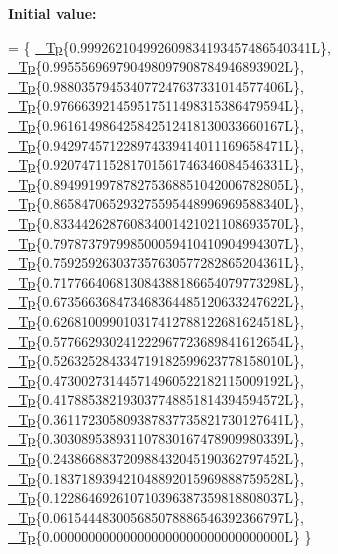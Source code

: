 {\bfseries Initial value\+:}
\begin{DoxyCode}
=
      \{
        \hyperlink{namespace____gnu__cxx_a3b19a9c800ca194374ef9172290f7d79}{\_Tp}\{0.999262104992609834193457486540341L\},
        \hyperlink{namespace____gnu__cxx_a3b19a9c800ca194374ef9172290f7d79}{\_Tp}\{0.995556969790498097908784946893902L\},
        \hyperlink{namespace____gnu__cxx_a3b19a9c800ca194374ef9172290f7d79}{\_Tp}\{0.988035794534077247637331014577406L\},
        \hyperlink{namespace____gnu__cxx_a3b19a9c800ca194374ef9172290f7d79}{\_Tp}\{0.976663921459517511498315386479594L\},
        \hyperlink{namespace____gnu__cxx_a3b19a9c800ca194374ef9172290f7d79}{\_Tp}\{0.961614986425842512418130033660167L\},
        \hyperlink{namespace____gnu__cxx_a3b19a9c800ca194374ef9172290f7d79}{\_Tp}\{0.942974571228974339414011169658471L\},
        \hyperlink{namespace____gnu__cxx_a3b19a9c800ca194374ef9172290f7d79}{\_Tp}\{0.920747115281701561746346084546331L\},
        \hyperlink{namespace____gnu__cxx_a3b19a9c800ca194374ef9172290f7d79}{\_Tp}\{0.894991997878275368851042006782805L\},
        \hyperlink{namespace____gnu__cxx_a3b19a9c800ca194374ef9172290f7d79}{\_Tp}\{0.865847065293275595448996969588340L\},
        \hyperlink{namespace____gnu__cxx_a3b19a9c800ca194374ef9172290f7d79}{\_Tp}\{0.833442628760834001421021108693570L\},
        \hyperlink{namespace____gnu__cxx_a3b19a9c800ca194374ef9172290f7d79}{\_Tp}\{0.797873797998500059410410904994307L\},
        \hyperlink{namespace____gnu__cxx_a3b19a9c800ca194374ef9172290f7d79}{\_Tp}\{0.759259263037357630577282865204361L\},
        \hyperlink{namespace____gnu__cxx_a3b19a9c800ca194374ef9172290f7d79}{\_Tp}\{0.717766406813084388186654079773298L\},
        \hyperlink{namespace____gnu__cxx_a3b19a9c800ca194374ef9172290f7d79}{\_Tp}\{0.673566368473468364485120633247622L\},
        \hyperlink{namespace____gnu__cxx_a3b19a9c800ca194374ef9172290f7d79}{\_Tp}\{0.626810099010317412788122681624518L\},
        \hyperlink{namespace____gnu__cxx_a3b19a9c800ca194374ef9172290f7d79}{\_Tp}\{0.577662930241222967723689841612654L\},
        \hyperlink{namespace____gnu__cxx_a3b19a9c800ca194374ef9172290f7d79}{\_Tp}\{0.526325284334719182599623778158010L\},
        \hyperlink{namespace____gnu__cxx_a3b19a9c800ca194374ef9172290f7d79}{\_Tp}\{0.473002731445714960522182115009192L\},
        \hyperlink{namespace____gnu__cxx_a3b19a9c800ca194374ef9172290f7d79}{\_Tp}\{0.417885382193037748851814394594572L\},
        \hyperlink{namespace____gnu__cxx_a3b19a9c800ca194374ef9172290f7d79}{\_Tp}\{0.361172305809387837735821730127641L\},
        \hyperlink{namespace____gnu__cxx_a3b19a9c800ca194374ef9172290f7d79}{\_Tp}\{0.303089538931107830167478909980339L\},
        \hyperlink{namespace____gnu__cxx_a3b19a9c800ca194374ef9172290f7d79}{\_Tp}\{0.243866883720988432045190362797452L\},
        \hyperlink{namespace____gnu__cxx_a3b19a9c800ca194374ef9172290f7d79}{\_Tp}\{0.183718939421048892015969888759528L\},
        \hyperlink{namespace____gnu__cxx_a3b19a9c800ca194374ef9172290f7d79}{\_Tp}\{0.122864692610710396387359818808037L\},
        \hyperlink{namespace____gnu__cxx_a3b19a9c800ca194374ef9172290f7d79}{\_Tp}\{0.061544483005685078886546392366797L\},
        \hyperlink{namespace____gnu__cxx_a3b19a9c800ca194374ef9172290f7d79}{\_Tp}\{0.000000000000000000000000000000000L\}
      \}
\end{DoxyCode}



